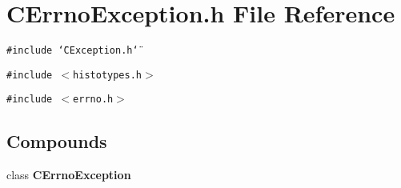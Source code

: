 \section{CErrno\-Exception.h File Reference}
\label{CErrnoException_8h}
{\tt \#include \char`\"{}CException.h\char`\"{}}\par
{\tt \#include $<$histotypes.h$>$}\par
{\tt \#include $<$errno.h$>$}\par
\subsection*{Compounds}
\begin{CompactItemize}
\item 
class {\bf CErrno\-Exception}
\end{CompactItemize}
